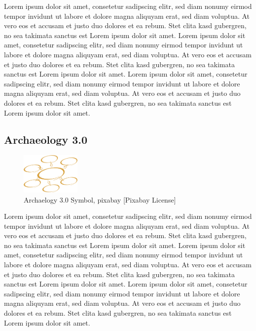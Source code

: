 \documentclass[twocolumn]{autart}
\begin{document}
Lorem ipsum dolor sit amet, consetetur sadipscing elitr, sed diam nonumy eirmod tempor invidunt ut labore et dolore magna aliquyam erat, sed diam voluptua. At vero eos et accusam et justo duo dolores et ea rebum. Stet clita kasd gubergren, no sea takimata sanctus est Lorem ipsum dolor sit amet. Lorem ipsum dolor sit amet, consetetur sadipscing elitr, sed diam nonumy eirmod tempor invidunt ut labore et dolore magna aliquyam erat, sed diam voluptua. At vero eos et accusam et justo duo dolores et ea rebum. Stet clita kasd gubergren, no sea takimata sanctus est Lorem ipsum dolor sit amet. Lorem ipsum dolor sit amet, consetetur sadipscing elitr, sed diam nonumy eirmod tempor invidunt ut labore et dolore magna aliquyam erat, sed diam voluptua. At vero eos et accusam et justo duo dolores et ea rebum. Stet clita kasd gubergren, no sea takimata sanctus est Lorem ipsum dolor sit amet.

\subsection{Archaeology 3.0}

\begin{figure}[!htb]
\begin{center}
\includegraphics[height=2cm]{a30.png}    %
\caption{Archaelogy 3.0 Symbol, pixabay [Pixabay License]}  %
\label{figa30symbol}                                 %
\end{center}                                 %
\end{figure}

Lorem ipsum dolor sit amet, consetetur sadipscing elitr, sed diam nonumy eirmod tempor invidunt ut labore et dolore magna aliquyam erat, sed diam voluptua. At vero eos et accusam et justo duo dolores et ea rebum. Stet clita kasd gubergren, no sea takimata sanctus est Lorem ipsum dolor sit amet. Lorem ipsum dolor sit amet, consetetur sadipscing elitr, sed diam nonumy eirmod tempor invidunt ut labore et dolore magna aliquyam erat, sed diam voluptua. At vero eos et accusam et justo duo dolores et ea rebum. Stet clita kasd gubergren, no sea takimata sanctus est Lorem ipsum dolor sit amet. Lorem ipsum dolor sit amet, consetetur sadipscing elitr, sed diam nonumy eirmod tempor invidunt ut labore et dolore magna aliquyam erat, sed diam voluptua. At vero eos et accusam et justo duo dolores et ea rebum. Stet clita kasd gubergren, no sea takimata sanctus est Lorem ipsum dolor sit amet. 
\end{document}
